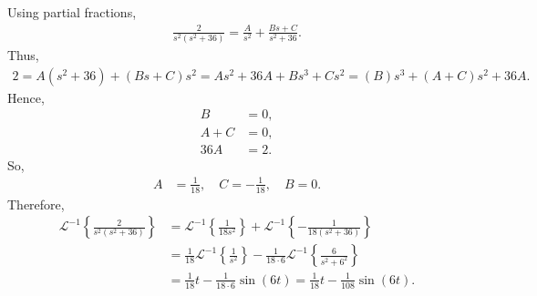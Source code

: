 \documentclass{report}
\begin{document}
    \bigbreak \noindent 
    Using partial fractions,
    \begin{align*}
        \frac{2}{s^{2}(s^{2}+36)} = \frac{A}{s^{2}} + \frac{Bs+C}{s^{2}+36}
    .\end{align*}
    Thus,
    \begin{align*}
        2 = A(s^{2} + 36) + (Bs + C)s^{2} = As^{2} + 36A + Bs^{3} + Cs^{2} = (B)s^{3} + (A+C)s^{2} + 36A
    .\end{align*}
    Hence,
    \begin{align*}
        B &= 0, \\
        A+C &= 0, \\
        36A &= 2 
    .\end{align*}
    So,
    \begin{align*}
        A &= \frac{1}{18}, \quad C = -\frac{1}{18}, \quad B = 0
    .\end{align*}
    Therefore,
    \begin{align*}
        \mathcal{L}^{-1}\left\{\frac{2}{s^{2}(s^{2}+36)}\right\} &= \mathcal{L}^{-1}\left\{\frac{1}{18s^{2}}\right\} + \mathcal{L}^{-1}\left\{-\frac{1}{18(s^{2}+36)}\right\} \\
        &=\frac{1}{18}\mathcal{L}^{-1}\left\{\frac{1}{s^{2}}\right\} - \frac{1}{18\cdot 6}\mathcal{L}^{-1}\left\{\frac{6}{s^{2}+6^{2}}\right\} \\
        &=\frac{1}{18}t - \frac{1}{18\cdot 6}\sin{\left(6t\right)} = \frac{1}{18}t - \frac{1}{108}\sin{\left(6t\right)}
    .\end{align*}
\end{document}
